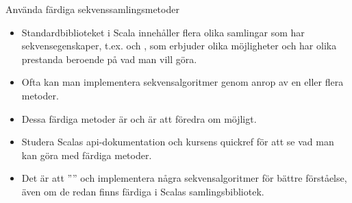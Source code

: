 \begin{Slide}{Använda färdiga sekvenssamlingsmetoder}
\begin{itemize}
\item Standardbiblioteket i Scala innehåller flera olika samlingar som har sekvensegenskaper, t.ex.  och , som erbjuder olika möjligheter och har olika prestanda beroende på vad man vill göra.

\item Ofta kan man implementera sekvensalgoritmer genom anrop av en eller flera  metoder.

\item Dessa färdiga metoder är  och är att föredra om möjligt.

\item Studera Scalas api-dokumentation och kursens quickref för att se vad man kan göra med färdiga metoder.

\item Det är  att '''' och implementera några sekvensalgoritmer  för bättre förståelse, även om de redan finns färdiga i Scalas samlingsbibliotek.

\end{itemize}
\end{Slide}



